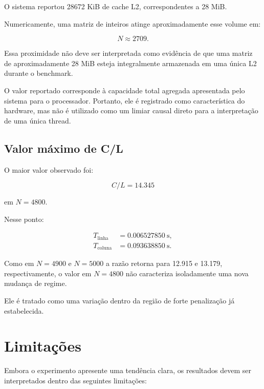 O sistema reportou 28672 KiB de cache L2, correspondentes a 28 MiB.

Numericamente, uma matriz de inteiros atinge aproximadamente esse volume
em:

\begin{equation}
    N \approx 2709.
\end{equation}

Essa proximidade não deve ser interpretada como evidência de que uma
matriz de aproximadamente 28 MiB esteja integralmente armazenada em uma
única L2 durante o benchmark.

O valor reportado corresponde à capacidade total agregada apresentada
pelo sistema para o processador. Portanto, ele é registrado como
característica do hardware, mas não é utilizado como um limiar causal
direto para a interpretação de uma única thread.


\subsection{Valor máximo de C/L}

O maior valor observado foi:

\begin{equation}
    C/L = 14.345
\end{equation}

em \(N=4800\).

Nesse ponto:

\begin{align}
T_{\mathrm{linha}}
&=
0.006527850\ \mathrm{s},
\\
T_{\mathrm{coluna}}
&=
0.093638850\ \mathrm{s}.
\end{align}

Como em \(N=4900\) e \(N=5000\) a razão retorna para 12.915 e 13.179,
respectivamente, o valor em \(N=4800\) não caracteriza isoladamente uma
nova mudança de regime.

Ele é tratado como uma variação dentro da região de forte penalização já
estabelecida.



\section{Limitações}

\label{sec:atvd01-limitacoes}

Embora o experimento apresente uma tendência clara, os resultados devem
ser interpretados dentro das seguintes limitações:


